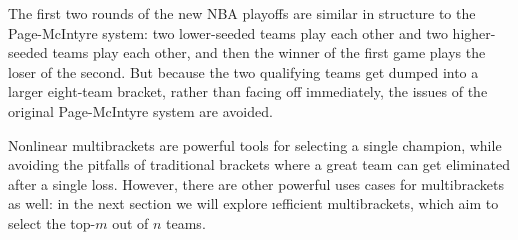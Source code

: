 {    The first two rounds of the new NBA playoffs are similar in structure to the Page-McIntyre system: two lower-seeded teams play each other and two higher-seeded teams play each other, and then the winner of the first game plays the loser of the second. But because the two qualifying teams get dumped into a larger eight-team bracket, rather than facing off immediately, the issues of the original Page-McIntyre system are avoided.

    Nonlinear multibrackets are powerful tools for selecting a single champion, while avoiding the pitfalls of traditional brackets where a great team can get eliminated after a single loss. However, there are other powerful uses cases for multibrackets as well: in the next section we will explore \i{efficient} multibrackets, which aim to select the top-$m$ out of $n$ teams.
}